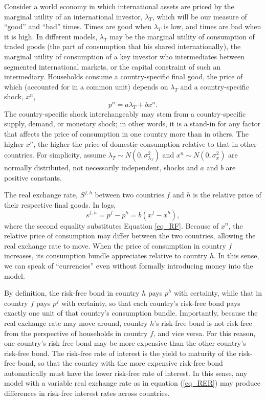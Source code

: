 \documentclass{ar-1col}
\begin{document}
Consider a world economy in which international assets are priced by the marginal utility of an international investor, $\lambda_T$, which will be our measure of ``good'' and ``bad'' times. Times are good when $\lambda_T$ is low, and times are bad when it is high. In different models, $\lambda_T$ may be the marginal utility of consumption of traded goods (the part of consumption that his shared internationally), the marginal utility of consumption of a key investor who intermediates between segmented international markets, or the capital constraint of such an intermediary. Households consume a country-specific final good, the price of which (accounted for in a common unit) depends on $\lambda_T$ and a country-specific shock, $x^n$,
\begin{equation}
  p^{n} = a\lambda_{T} + b x^{n}.  
  \label{eq_RF}
\end{equation}%
The country-specific shock interchangeably may stem from a country-specific supply, demand, or monetary shock; in other words, it is a stand-in for any factor that affects the price of consumption in one country more than in others. The higher $x^{n}$, the higher the price of domestic consumption relative to that in other countries. For simplicity, assume $\lambda _{T}\sim N(0,\sigma^2_{\lambda_{T}})$ and $x^{n} \sim N(0,\sigma^2_x) $ are normally distributed, not necessarily independent, shocks and $a$ and $b$ are positive constants.

The real exchange rate, $S^{f, h}$ between two countries $f$ and $h$ is the relative price of their respective final goods. In logs,
\begin{equation}
  s^{f,h} 
  = p^f - p^h 
  = b(x^f - x^h),
\label{eq_RER}
\end{equation}
where the second equality substitutes Equation \eqref{eq_RF}. Because of $x^{n}$, the relative price of consumption may differ between the two countries, allowing the real exchange rate to move. When the price of consumption in country $f$ increases, its consumption bundle appreciates relative to country $h$. In this sense, we can speak of ``currencies'' even without formally introducing money into the model.


By definition, the risk-free bond in country $h$ pays $p^h$ with certainty, while that in country $f$ pays $p^f$ with certainty, so that each country's risk-free bond pays exactly one unit of that country's consumption bundle. Importantly, because the real exchange rate may move around, country $h$'s risk-free bond is not risk-free from the perspective of households in country $f$, and vice versa. For this reason, one country's risk-free bond may be more expensive than the other country's risk-free bond. The risk-free rate of interest is the yield to maturity of the risk-free bond, so that the country with the more expensive risk-free bond automatically must have the lower risk-free rate of interest. In this sense, any model with a variable real exchange rate as in equation (\ref{eq_RER}) may produce differences in risk-free interest rates across countries.
\end{document}

